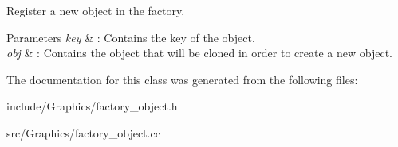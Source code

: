 Register a new object in the factory. 


\begin{DoxyParams}{Parameters}
{\em key} & \+: Contains the key of the object. \\
\hline
{\em obj} & \+: Contains the object that will be cloned in order to create a new object. \\
\hline
\end{DoxyParams}


The documentation for this class was generated from the following files\+:\begin{DoxyCompactItemize}
\item 
include/\+Graphics/factory\+\_\+object.\+h\item 
src/\+Graphics/factory\+\_\+object.\+cc\end{DoxyCompactItemize}
